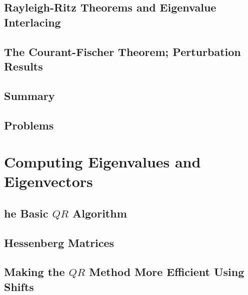 \documentclass[a4paper]{article}
\begin{document}
\subsection{ Rayleigh-Ritz Theorems and Eigenvalue Interlacing} %

\subsection{ The Courant-Fischer Theorem; Perturbation Results} %

\subsection{ Summary} %

\subsection{ Problems} %


\newpage
\section{Computing Eigenvalues and Eigenvectors}
\subsection{ he Basic $QR$ Algorithm} %

\subsection{ Hessenberg Matrices} %

\subsection{ Making the $QR$ Method More Efficient Using Shifts} %
\end{document}
